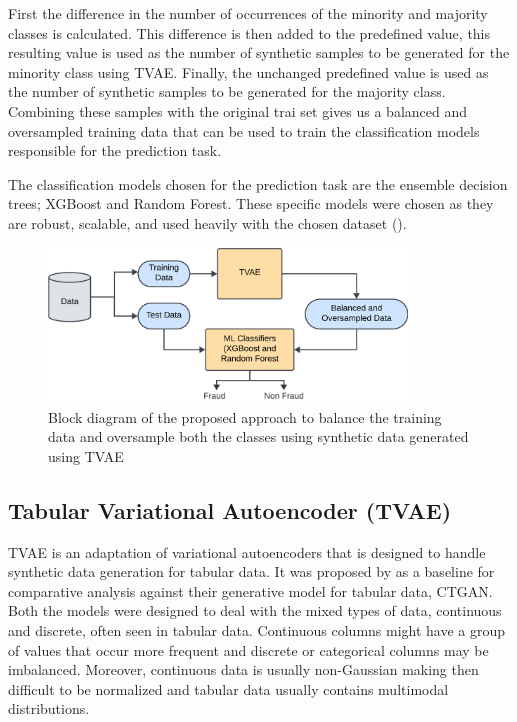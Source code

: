 \documentclass[twoside,11pt]{article}
\begin{document}
\begin{keywords}
First the difference in the number of occurrences of the minority and majority classes is calculated. This difference is then added to the predefined value, this resulting value is used as the number of synthetic samples to be generated for the minority class using TVAE. Finally, the unchanged predefined value is used as the number of synthetic samples to be generated for the majority class. Combining these samples with the original trai set gives us a balanced and oversampled training data that can be used to train the classification models responsible for the prediction task. 

The classification models chosen for the prediction task are the ensemble decision trees; XGBoost and Random Forest. These specific models were chosen as they are robust, scalable, and used heavily with the chosen dataset (\cite{schrijverAutomobileInsuranceFraud2024, Salmi2022, aiemsuwanNovelHybridMethod2024, owolabiAutoInsuranceFraudDetection2024}). 

\begin{figure}
  \centering
  \includegraphics[width=0.85\textwidth]{images/model_tvae.png}
  \caption{Block diagram of the proposed approach to balance the training data and oversample both the classes using synthetic data generated using TVAE}
  \label{fig:model}
\end{figure}

\subsection{Tabular Variational Autoencoder (TVAE)}
TVAE is an adaptation of variational autoencoders that is designed to handle synthetic data generation for tabular data. It was proposed by \cite{XuRp} as a baseline for comparative analysis against their generative model for tabular data, CTGAN. Both the models were designed to deal with the mixed types of data, continuous and discrete, often seen in tabular data. Continuous columns might have a group of values that occur more frequent and discrete or categorical columns may be imbalanced. Moreover, continuous data is usually non-Gaussian making then difficult to be normalized and tabular data usually contains multimodal distributions. 


\end{keywords}
\end{document}
